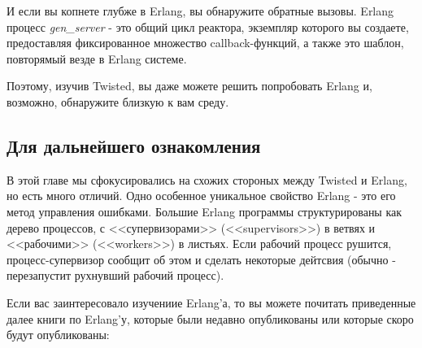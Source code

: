 И если вы копнете глубже в Erlang, вы обнаружите 
обратные вызовы. Erlang процесс \textit{gen\_server} - это 
общий цикл реактора, экземпляр которого вы создаете, 
предоставляя фиксированное множество callback-функций, а также это 
шаблон, повторямый везде в Erlang системе.

Поэтому, изучив Twisted, вы даже можете решить попробовать Erlang и, 
возможно, обнаружите близкую к вам среду. 
 

\subsection{Для дальнейшего ознакомления}

В этой главе мы сфокусировались на схожих стороных между 
Twisted и Erlang, но есть много отличий. Одно особенное 
уникальное свойство Erlang - это его метод управления ошибками. 
Большие Erlang программы структурированы как дерево 
процессов, с <<супервизорами>> (<<supervisors>>)  в ветвях и <<рабочими>> (<<workers>>) 
в листьях. Если рабочий процесс рушится, процесс-супервизор сообщит об этом 
и сделать некоторые дейтсвия (обычно - перезапустит рухнувший рабочий процесс).


Если вас заинтересовало изучениие Erlang'а, то вы можете почитать приведенные 
далее книги по Erlang'у, которые были недавно опубликованы 
или которые скоро будут опубликованы: 

